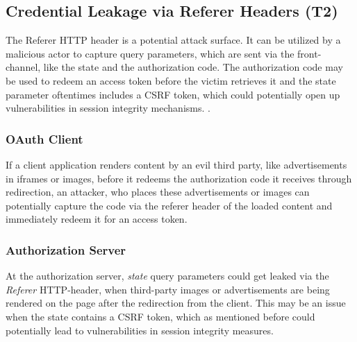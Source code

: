 \subsection[Credential Leakage via Referer Headers]{Credential Leakage via Referer Headers (T2)}
\label{threat:T2}
The Referer HTTP header is a potential attack surface. It can be utilized by a
malicious actor to capture query parameters, which are sent via the front-channel, like the state and the authorization code. The authorization code may
be used to redeem an access token before the victim retrieves it and the state
parameter oftentimes includes a CSRF token, which could potentially open up
vulnerabilities in session integrity mechanisms.
\cite{fett2016comprehensive}.

\subsubsection{OAuth Client}
If a client application renders content by an evil third party, like advertisements in iframes or images, before it redeems the authorization code it receives through redirection, an attacker, who places these advertisements or images can potentially capture the code via the referer header of the loaded content and immediately redeem it for an access token.

\subsubsection{Authorization Server}
At the authorization server, \emph{state} query parameters could get leaked via the \emph{Referer} HTTP-header, when third-party images or advertisements are being rendered on the page after the redirection from the client. This may be an issue when the state contains a CSRF token, which as mentioned before could potentially lead to vulnerabilities in session integrity measures.


